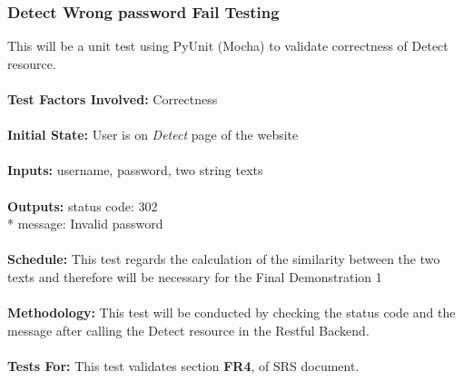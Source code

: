 \documentclass[12pt, titlepage]{article}
\begin{document}
\subsubsection{{Detect Wrong password Fail Testing}}
This will be a unit test using PyUnit (Mocha) to validate correctness of Detect resource. \\
\\
\textbf{Test Factors Involved:} Correctness \\
\\
\textbf{Initial State: } User is on \textit{Detect} page of the website \\
\\
\textbf{Inputs: } username, password, two string texts \\
\\
\textbf{Outputs:} status code: 302 \\*
                  message: Invalid password \\
\\
\textbf{Schedule:} This test regards the calculation of the similarity between the two texts and therefore will be necessary for the Final Demonstration 1 \\
\\
\textbf{Methodology: } This test will be conducted by checking the status code and the message after calling the Detect resource in the Restful Backend. \\
\\
\textbf{Tests For:} This test validates section \textbf{FR4}, of SRS document.

\end{document}
